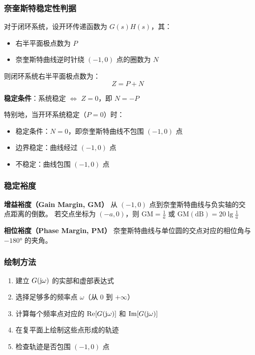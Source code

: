 \subsubsection{奈奎斯特稳定性判据}
对于闭环系统，设开环传递函数为 $G(s)H(s)$，其：
\begin{itemize}
    \item 右半平面极点数为 $P$
    \item 奈奎斯特曲线逆时针绕 $(-1, 0)$ 点的圈数为 $N$
\end{itemize}

则闭环系统右半平面极点数为：
$$Z = P + N$$

\textbf{稳定条件}：系统稳定 $\Leftrightarrow$ $Z = 0$，即 $N = -P$

特别地，当开环系统稳定（$P = 0$）时：
\begin{itemize}
    \item 稳定条件：$N = 0$，即奈奎斯特曲线不包围 $(-1, 0)$ 点
    \item 边界稳定：曲线经过 $(-1, 0)$ 点
    \item 不稳定：曲线包围 $(-1, 0)$ 点
\end{itemize}

\subsubsection{稳定裕度}

\textbf{增益裕度（Gain Margin, GM）}
从 $(-1, 0)$ 点到奈奎斯特曲线与负实轴的交点距离的倒数。
若交点坐标为 $(-a, 0)$，则 $\text{GM} = \frac{1}{a}$ 或 $\text{GM}(\text{dB}) = 20\lg\frac{1}{a}$

\textbf{相位裕度（Phase Margin, PM）}
奈奎斯特曲线与单位圆的交点对应的相位角与 $-180°$ 的夹角。

\subsubsection{绘制方法}
\begin{enumerate}
    \item 建立 $G(\mathrm{j}\omega)$ 的实部和虚部表达式
    \item 选择足够多的频率点 $\omega$（从 $0$ 到 $+\infty$）
    \item 计算每个频率点对应的 $\text{Re}[G(\mathrm{j}\omega)]$ 和 $\text{Im}[G(\mathrm{j}\omega)]$
    \item 在复平面上绘制这些点形成的轨迹
    \item 检查轨迹是否包围 $(-1, 0)$ 点
\end{enumerate}
